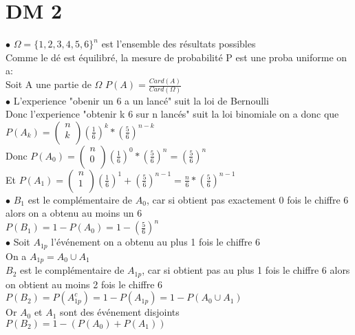 \documentclass{article}
\author{Frederic Becerril}
\begin{document}
\part*{DM 2}

$\bullet$ $\Omega = \{1, 2, 3, 4, 5, 6\}^n$ est l'ensemble des résultats possibles\\
Comme le dé est équilibré, la mesure de probabilité P est une proba uniforme on a:\\
Soit A une partie de $\Omega$ $P(A) = \frac{Card(A)}{Card(\Omega)}$\\
$\bullet$ L'experience "obenir un 6 a un lancé" suit la loi de Bernoulli\\
Donc l'experience "obtenir k 6 sur n lancés" suit la loi binomiale on a donc que\\
$P(A_k) = \begin{pmatrix}
    n\\
    k\\
\end{pmatrix} (\frac{1}{6})^k * (\frac{5}{6})^{n - k}$\\
Donc $P(A_0) = \begin{pmatrix}
    n\\
    0\\
\end{pmatrix} (\frac{1}{6})^0 * (\frac{5}{6})^{n} = (\frac{5}{6})^{n}$\\
Et $P(A_1) = \begin{pmatrix}
    n\\
    1\\
\end{pmatrix} (\frac{1}{6})^1 + (\frac{5}{6})^{n - 1} = \frac{n}{6} * (\frac{5}{6})^{n - 1}$\\
$\bullet$ $B_1$ est le complémentaire de $A_0$, car si obtient pas exactement 0 fois le chiffre 6
alors on a obtenu au moins un 6\\
$P(B_1) = 1 - P(A_0) = 1 - (\frac{5}{6})^n$\\
$\bullet$ Soit $A_{1p}$ l'événement on a obtenu au plus 1 fois le chiffre 6\\
On a $A_{1p} = A_0 \cup A_{1}$\\
$B_2$ est le complémentaire de $A_{1p}$, car si obtient pas au plus 1 fois le chiffre 6 alors on obtient au moins 2 fois le chiffre 6\\
$P(B_2) = P(A_{1p}^c) = 1 - P(A_{1p}) = 1 - P(A_0 \cup A_1)$\\
Or $A_0$ et $A_1$ sont des événement disjoints\\
$P(B_2) = 1 - (P(A_0) + P(A_1))$\\
\end{document}
